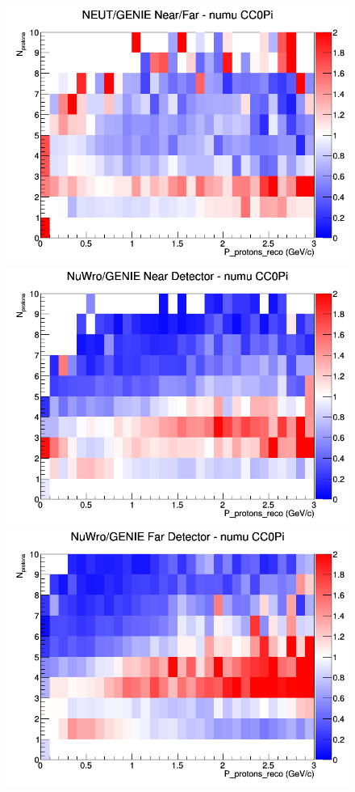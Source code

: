 \documentclass[12pt]{article}
\begin{document}
\begin{figure}[h]
\endminipage
{}
\includegraphics[width=\linewidth]{eff_N_P/FGT/protons/ratios/CC0Pi_NEUT_GENIE_numu_NF_N_P.png}
\endminipage
\newline
{}
\includegraphics[width=\linewidth]{eff_N_P/FGT/protons/ratios/CC0Pi_NuWro_GENIE_numu_near_N_P.png}
\endminipage
{}
\includegraphics[width=\linewidth]{eff_N_P/FGT/protons/ratios/CC0Pi_NuWro_GENIE_numu_far_N_P.png}

\end{figure}
\end{document}
